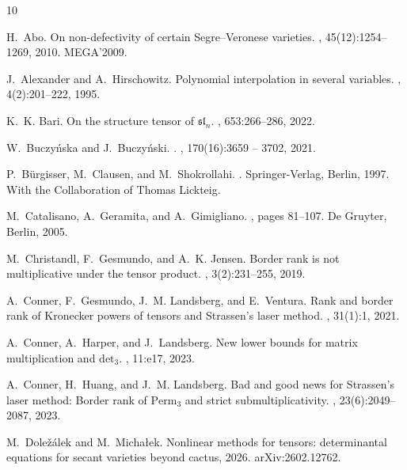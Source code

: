 \documentclass[12pt]{amsart}
\theoremstyle{definition}
\theoremstyle{remark}
\theoremstyle{definition}
\begin{document}
	
\begin{thebibliography}{10}

H.~Abo.
\newblock On non-defectivity of certain {S}egre–{V}eronese varieties.
, 45(12):1254--1269, 2010.
\newblock MEGA’2009.

J.~Alexander and A.~Hirschowitz.
\newblock Polynomial interpolation in several variables.
, 4(2):201--222, 1995.

K.~K. Bari.
\newblock On the structure tensor of {$\mathfrak{sl}_n$}.
, 653:266--286, 2022.

W.~Buczyńska and J.~Buczyński.
.
, 170(16):3659 -- 3702, 2021.

P.~B{\"u}rgisser, M.~Clausen, and M.~Shokrollahi.
.
\newblock Springer-Verlag, Berlin, 1997.
\newblock With the Collaboration of Thomas Lickteig.

M.~Catalisano, A.~Geramita, and A.~Gimigliano.
, pages
  81--107.
\newblock De Gruyter, Berlin, 2005.

M.~Christandl, F.~Gesmundo, and A.~K. Jensen.
\newblock Border rank is not multiplicative under the tensor product.
, 3(2):231--255, 2019.

A.~Conner, F.~Gesmundo, J.~M. Landsberg, and E.~Ventura.
\newblock Rank and border rank of {K}ronecker powers of tensors and
  {S}trassen's laser method.
, 31(1):1, 2021.

A.~Conner, A.~Harper, and J.~Landsberg.
\newblock New lower bounds for matrix multiplication and {$\mathrm{det}_3$}.
, 11:e17, 2023.

A.~Conner, H.~Huang, and J.~M. Landsberg.
\newblock Bad and good news for {S}trassen's laser method: Border rank of
  {$\mathrm{Perm}_3$} and strict submultiplicativity.
, 23(6):2049--2087, 2023.

M.~Doležálek and M.~Michałek.
\newblock Nonlinear methods for tensors: determinantal equations for secant
  varieties beyond cactus, 2026.
\newblock arXiv:2602.12762.


\end{thebibliography}
\end{document}
